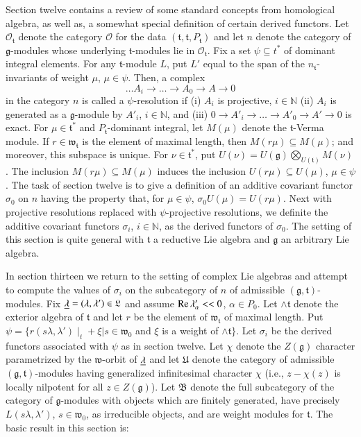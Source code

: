 Section twelve contains a review of some standard concepts from
homological algebra, as well as, a somewhat special definition of
certain derived functors. Let $\mathscr{O}_{ \mathfrak{t}}$ denote the
category $\mathscr{O}$ for the data $( \mathfrak{t},  \mathfrak{t}, P_
\mathfrak{t})$ and let $n$ denote the category of $
\mathfrak{g}$-modules whose underlying $ \mathfrak{t}$-modules lie in
$ \mathscr{O}_\mathfrak{t}$. Fix a set $\psi \subseteq t^*$ of
dominant integral elements. For any $ \mathfrak{t}$-module $L$, put
$L'$ equal to the span of the $n_ \mathfrak{t}$-invariants of weight
$\mu$, $\mu \in \psi$. Then, a complex
$$
\ldots A_i \to \ldots \to A_0 \to A \to 0
$$
in the category $n$ is called a $\psi$-resolution if (i) $A_i$ is
projective, $i \in \mathbb{N}$ (ii) $A_i$ is generated as a $
\mathfrak{g}$-module by $A'_i$, $i \in \mathbb{N}$, and (iii) $0 \to
A'_i \to \ldots \to A'_0 \to A' \to 0$ is exact. For $\mu \in
\mathfrak{t}^*$ and $P_ \mathfrak{t}$-dominant integral, let $M(\mu)$
denote the $ \mathfrak{t}$-Verma module. If $r \in  \mathfrak{w}_
\mathfrak{t}$ is the element of maximal length, then $M(r\mu)
\subseteq M(\mu)$; and moreover, this subspace is unique. For $\nu \in
 \mathfrak{t}^*$, put $U(\nu) = U( \mathfrak{g})
 \bigotimes\limits_{U( \mathfrak{t})} M(\nu)$.  The inclusion
 $M(r\mu) \subseteq M(\mu)$ induces the inclusion $U(r\mu) \subseteq
 U(\mu)$, $\mu \in \psi$. The task of section twelve is to give a
 definition of an additive covariant functor $\sigma_0$ on $n$ having
 the property that, for $\mu \in \psi$, $\sigma_0 U(\mu) =
 U(r\mu)$. Next with projective resolutions replaced with
 $\psi$-projective resolutions, we definite the additive covariant
 functors $\sigma_i$, $i \in \mathbb{N}$, as the derived\pageoriginale
 functors of $\sigma_0$. The setting of this section is quite general
 with $ \mathfrak{t}$ a reductive Lie algebra and $ \mathfrak{g}$ an
 arbitrary Lie algebra.

In section thirteen we return to the setting of complex Lie algebras
and attempt to compute the values of $\sigma_i$ on the subcategory of
$n$ of admissible $( \mathfrak{g},  \mathfrak{t})$-modules. Fix
$\underline{\lambda} = (\lambda, \lambda') \in  \mathfrak{L}$ and assume $\operatorname{Re}
\lambda'_\alpha << 0 $, $\alpha \in P_0$. Let $\wedge \mathfrak{t}$
denote the exterior algebra of $\mathfrak{t}$ and let $r$ be the
element of $\mathfrak{w}_\mathfrak{t}$ of maximal length. Put $\psi =
\{r(s\lambda, \lambda')\mid_t + \xi | s\in \mathfrak{w}_0$ and $\xi$
is a weight of $\wedge \mathfrak{t}\}$. Let $\sigma_i$ be the derived
functors associated with $\psi$ as in section twelve. Let $\chi$ denote
the $Z(\mathfrak{g})$ character parametrized by the
$\mathfrak{w}$-orbit of $\underline{\lambda}$ and let $\mathfrak{U}$ denote
the category of admissible $(\mathfrak{g}, \mathfrak{t})$-modules
having generalized infinitesimal character $\chi$ (i.e., $z- \chi (z)$
is locally nilpotent for all $z \in Z(\mathfrak{g})$). Let
$\mathfrak{B}$ denote the full subcategory of the category of
$\mathfrak{g}$-modules with objects which are finitely generated, have
precisely $L(s\lambda, \lambda')$, $s \in \mathfrak{w}_0$, as
irreducible objects, and are weight modules for $\mathfrak{t}$. The
basic result in this section is:

